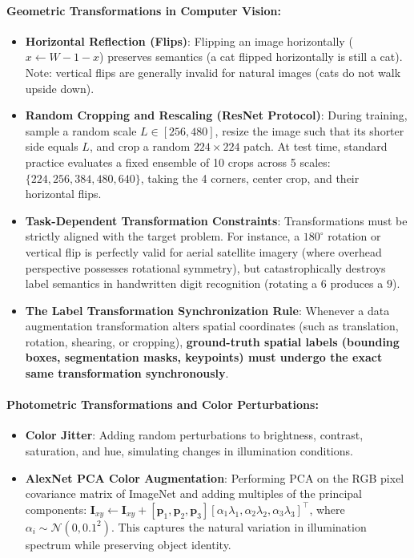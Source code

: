 \paragraph{Geometric Transformations in Computer Vision:}
\begin{itemize}[noitemsep,topsep=2pt,parsep=0pt,partopsep=0pt]
  \item \textbf{Horizontal Reflection (Flips)}: Flipping an image horizontally ($x \leftarrow W - 1 - x$) preserves semantics (a cat flipped horizontally is still a cat). Note: vertical flips are generally invalid for natural images (cats do not walk upside down).
  \item \textbf{Random Cropping and Rescaling (ResNet Protocol)}: During training, sample a random scale $L \in [256, 480]$, resize the image such that its shorter side equals $L$, and crop a random $224 \times 224$ patch. At test time, standard practice evaluates a fixed ensemble of 10 crops across 5 scales: $\{224, 256, 384, 480, 640\}$, taking the 4 corners, center crop, and their horizontal flips.
  \item \textbf{Task-Dependent Transformation Constraints}: Transformations must be strictly aligned with the target problem. For instance, a $180^\circ$ rotation or vertical flip is perfectly valid for aerial satellite imagery (where overhead perspective possesses rotational symmetry), but catastrophically destroys label semantics in handwritten digit recognition (rotating a $6$ produces a $9$).
  \item \textbf{The Label Transformation Synchronization Rule}: Whenever a data augmentation transformation alters spatial coordinates (such as translation, rotation, shearing, or cropping), \textbf{ground-truth spatial labels (bounding boxes, segmentation masks, keypoints) must undergo the exact same transformation synchronously}.
\end{itemize}

\paragraph{Photometric Transformations and Color Perturbations:}
\begin{itemize}[noitemsep,topsep=2pt,parsep=0pt,partopsep=0pt]
  \item \textbf{Color Jitter}: Adding random perturbations to brightness, contrast, saturation, and hue, simulating changes in illumination conditions.
  \item \textbf{AlexNet PCA Color Augmentation}: Performing PCA on the RGB pixel covariance matrix of ImageNet and adding multiples of the principal components: $\mathbf{I}_{xy} \leftarrow \mathbf{I}_{xy} + [\mathbf{p}_1, \mathbf{p}_2, \mathbf{p}_3][\alpha_1 \lambda_1, \alpha_2 \lambda_2, \alpha_3 \lambda_3]^\top$, where $\alpha_i \sim \mathcal{N}(0, 0.1^2)$. This captures the natural variation in illumination spectrum while preserving object identity.
\end{itemize}

